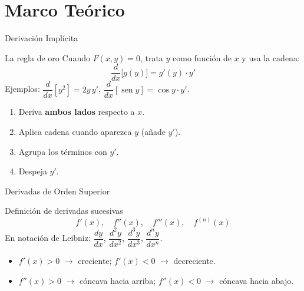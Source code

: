 \documentclass[aspectratio=169]{beamer}
\begin{document}
\begin{frame}[plain]
  \titlepage
\end{frame}

\section{Marco Teórico}

\begin{frame}{Derivación Implícita}
  \begin{block}{La regla de oro}
    Cuando $F(x,y) = 0$, trata $y$ como función de $x$ y usa la cadena:
    \[
      \frac{d}{dx}\bigl[g(y)\bigr] = g'(y)\cdot y'
    \]
    Ejemplos: $\dfrac{d}{dx}[y^2] = 2y\,y'$, \quad $\dfrac{d}{dx}[\operatorname{sen} y] = \cos y\cdot y'$.
  \end{block}
  \vspace{6pt}
  \begin{mwpasos}[Pasos]
    \begin{enumerate}
      \item Deriva \textbf{ambos lados} respecto a $x$.
      \item Aplica cadena cuando aparezca $y$ (añade $y'$).
      \item Agrupa los términos con $y'$.
      \item Despeja $y'$.
    \end{enumerate}
  \end{mwpasos}
\end{frame}

\begin{frame}{Derivadas de Orden Superior}
  \begin{block}{Definición de derivadas sucesivas}
    \[
      f'(x), \quad f''(x), \quad f'''(x), \quad f^{(n)}(x)
    \]
    En notación de Leibniz: $\dfrac{dy}{dx}$, $\dfrac{d^2y}{dx^2}$, $\dfrac{d^3y}{dx^3}$, $\dfrac{d^ny}{dx^n}$.
  \end{block}
  \vspace{6pt}
  \begin{mwextra}
    \begin{itemize}
      \item $f'(x) > 0$ $\to$ creciente; $f'(x) < 0$ $\to$ decreciente.
      \item $f''(x) > 0$ $\to$ cóncava hacia arriba; $f''(x) < 0$ $\to$ cóncava hacia abajo.
    \end{itemize}
  \end{mwextra}
\end{frame}
\end{document}
